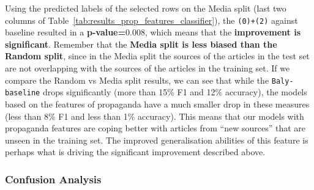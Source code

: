 
Using the predicted labels of the selected rows on the Media split (last two columns of Table~\ref{tab:results_prop_features_classifier}), the \texttt{(0)+(2)} against baseline resulted in a \textbf{p-value=$0.008$}, which means that the \textbf{improvement is significant}.
Remember that the \textbf{Media split is less biased than the Random split}, since in the Media split the sources of the articles in the test set are not overlapping with the sources of the articles in the training set. If we compare the Random vs Media split results, we can see that while the \texttt{Baly-baseline} drops significantly (more than 15\% F1 and 12\% accuracy), the models based on the features of propaganda have a much smaller drop in these measures (less than 8\% F1 and less than 1\% accuracy).
This means that our models with propaganda features are coping better with articles from ``new sources'' that are unseen in the training set. 
The improved generalisation abilities of this feature is perhaps what is driving the significant improvement described above. %

\subsubsection{Confusion Analysis}


